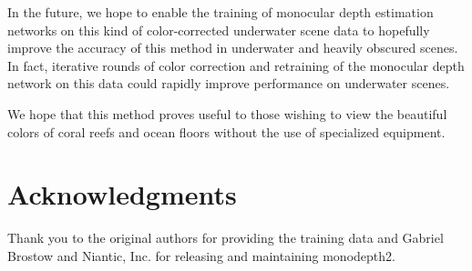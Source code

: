 \documentclass[10pt,twocolumn,letterpaper]{article}
\begin{document}
In the future, we hope to enable the training of monocular depth estimation networks on this kind of color-corrected
underwater scene data to hopefully improve the accuracy of this method in underwater and heavily obscured scenes.
In fact, iterative rounds of color correction and retraining of the monocular depth network on this data could
rapidly improve performance on underwater scenes.

We hope that this method proves useful to those wishing to view the beautiful colors of coral reefs and ocean floors
without the use of specialized equipment.

\section*{Acknowledgments}
Thank you to the original authors for providing the training data and Gabriel Brostow and Niantic, Inc. for
releasing and maintaining monodepth2.

{\small

}
\end{document}
